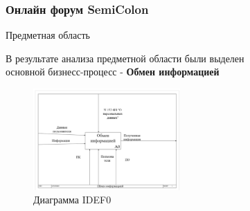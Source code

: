 \documentclass[aspectratio=169]{beamer}
\begin{document}
\begin{frame}
  \frametitle{Онлайн форум SemiColon}
  
  \begin{center}
    \huge{Предметная область}
  \end{center}
  
  \begin{center}
    В результате анализа предметной области были выделен \\
    основной бизнесс-процесс - \large{\textbf{Обмен информацией}}     
  \end{center}

  \begin{center}
    \begin{figure}
      \centering
      \includegraphics[width=0.5\textwidth]{assets/idef0.png}
      \caption{Диаграмма IDEF0}
    \end{figure}
  \end{center}
  
\end{frame}
\end{document}
